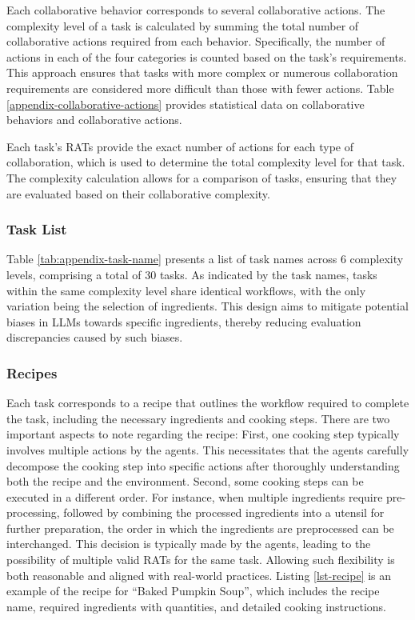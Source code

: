 \documentclass[11pt]{article}
\begin{document}
Each collaborative behavior corresponds to several collaborative actions. The complexity level of a task is calculated by summing the total number of collaborative actions required from each behavior. Specifically, the number of actions in each of the four categories is counted based on the task's requirements. This approach ensures that tasks with more complex or numerous collaboration requirements are considered more difficult than those with fewer actions. Table \ref{appendix-collaborative-actions} provides statistical data on collaborative behaviors and collaborative actions.

Each task's RATs provide the exact number of actions for each type of collaboration, which is used to determine the total complexity level for that task. The complexity calculation allows for a comparison of tasks, ensuring that they are evaluated based on their collaborative complexity.


\subsubsection{Task List}

Table \ref{tab:appendix-task-name} presents a list of task names across 6 complexity levels, comprising a total of 30 tasks. As indicated by the task names, tasks within the same complexity level share identical workflows, with the only variation being the selection of ingredients. This design aims to mitigate potential biases in LLMs towards specific ingredients, thereby reducing evaluation discrepancies caused by such biases.






\subsubsection{Recipes}

Each task corresponds to a recipe that outlines the workflow required to complete the task, including the necessary ingredients and cooking steps. There are two important aspects to note regarding the recipe: First, one cooking step typically involves multiple actions by the agents. This necessitates that the agents carefully decompose the cooking step into specific actions after thoroughly understanding both the recipe and the environment. Second, some cooking steps can be executed in a different order. For instance, when multiple ingredients require pre-processing, followed by combining the processed ingredients into a utensil for further preparation, the order in which the ingredients are preprocessed can be interchanged. This decision is typically made by the agents, leading to the possibility of multiple valid RATs for the same task. Allowing such flexibility is both reasonable and aligned with real-world practices. Listing \ref{lst-recipe} is an example of the recipe for ``Baked Pumpkin Soup'', which includes the recipe name, required ingredients with quantities, and detailed cooking instructions.
\end{document}
